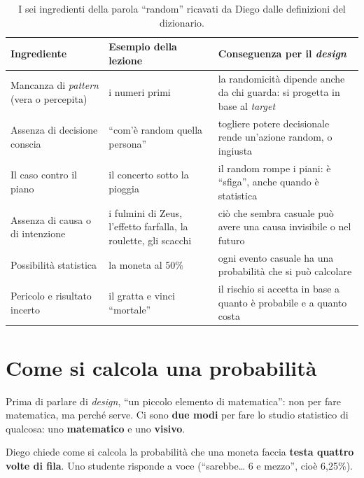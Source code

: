 \begin{table}[htbp]
\centering
\small
\begin{tabular}{@{}>{\raggedright\arraybackslash}p{3.6cm}>{\raggedright\arraybackslash}p{5.0cm}>{\raggedright\arraybackslash}p{5.0cm}@{}}
\toprule
\textbf{Ingrediente} & \textbf{Esempio della lezione} & \textbf{Conseguenza per il
\emph{design}} \\
\midrule
Mancanza di \emph{pattern} (vera o percepita) & i numeri primi & la randomicità dipende anche
  da chi guarda: si progetta in base al \emph{target} \\
\addlinespace
Assenza di decisione conscia & ``com'è random quella persona'' & togliere potere decisionale
  rende un'azione random, o ingiusta \\
\addlinespace
Il caso contro il piano & il concerto sotto la pioggia & il random rompe i piani: è
  ``sfiga'', anche quando è statistica \\
\addlinespace
Assenza di causa o di intenzione & i fulmini di Zeus, l'effetto farfalla, la roulette, gli
  scacchi & ciò che sembra casuale può avere una causa invisibile o nel futuro \\
\addlinespace
Possibilità statistica & la moneta al 50\% & ogni evento casuale ha una probabilità che si
  può calcolare \\
\addlinespace
Pericolo e risultato incerto & il gratta e vinci ``mortale'' & il rischio si accetta in
  base a quanto è probabile e a quanto costa \\
\bottomrule
\end{tabular}
\caption{I sei ingredienti della parola ``random'' ricavati da Diego dalle definizioni del
dizionario.}
\label{a15:tab:definizioni}
\end{table}

\section{Come si calcola una probabilità}
\label{a15:sec:calcolo}

Prima di parlare di \emph{design}, ``un piccolo elemento di matematica'': non per fare
matematica, ma perché serve. Ci sono \textbf{due modi} per fare lo studio statistico di
qualcosa: uno \textbf{matematico} e uno \textbf{visivo}.

Diego chiede come si calcola la probabilità che una moneta faccia \textbf{testa quattro volte
di fila}. Uno studente risponde a voce (``sarebbe\ldots{} 6 e mezzo'', cioè 6,25\%).

